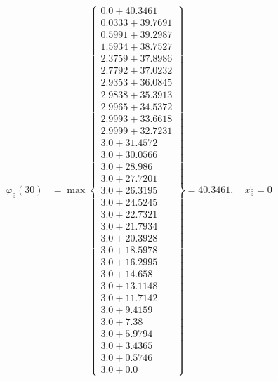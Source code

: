 \documentclass{article}
\begin{document}
\begin{align*}
  
\varphi_{9}(30) &= \max \left\{ \begin{array}{c}
0.0 + 40.3461 \\
 0.0333 + 39.7691 \\
 0.5991 + 39.2987 \\
 1.5934 + 38.7527 \\
 2.3759 + 37.8986 \\
 2.7792 + 37.0232 \\
 2.9353 + 36.0845 \\
 2.9838 + 35.3913 \\
 2.9965 + 34.5372 \\
 2.9993 + 33.6618 \\
 2.9999 + 32.7231 \\
 3.0 + 31.4572 \\
 3.0 + 30.0566 \\
 3.0 + 28.986 \\
 3.0 + 27.7201 \\
 3.0 + 26.3195 \\
 3.0 + 24.5245 \\
 3.0 + 22.7321 \\
 3.0 + 21.7934 \\
 3.0 + 20.3928 \\
 3.0 + 18.5978 \\
 3.0 + 16.2995 \\
 3.0 + 14.658 \\
 3.0 + 13.1148 \\
 3.0 + 11.7142 \\
 3.0 + 9.4159 \\
 3.0 + 7.38 \\
 3.0 + 5.9794 \\
 3.0 + 3.4365 \\
 3.0 + 0.5746 \\
 3.0 + 0.0
\end{array} \right\}=40.3461,\quad x_{9}^0=0\\
  
  
  

\end{align*}
\end{document}

